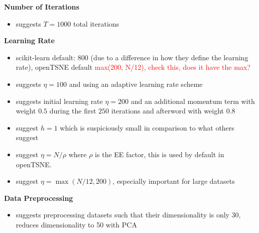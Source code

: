 \textbf{Number of Iterations}
\begin{itemize}
  \item \cite{vdMaa08} suggests $T=1000$ total iterations 
\end{itemize}

\textbf{Learning Rate}
\begin{itemize}
  \item scikit-learn default: 800 (due to a difference in how they define the learning rate), openTSNE default \textcolor{red}{max(200, N/12), check this, does it have the max?}
  \item \cite{vdMaa08} suggests $\eta =100$ and using an adaptive learning rate scheme
  \item \cite{vdMaa14} suggests initial learning rate $\eta=200$ and an additional momentum term with weight $0.5$ during the first $250$ iterations and afterword with weight $0.8$ 
  \item \cite{LinStei22} suggest $h=1$ which is suspiciously small in comparison to what others suggest
  \item \cite{belkina19} suggest $\eta = N/\rho$ where $\rho$ is the EE factor, this is used by default in openTSNE. 
  \item \cite{KoBe19SingleCell} suggest $\eta = \max(N/12, 200)$, especially important for large datasets 
\end{itemize}

\textbf{Data Preprocessing}
\begin{itemize}
  \item \cite{vdMaa08} suggests preprocessing datasets such that their dimensionality is only $30$, \cite{vdMaa14} reduces dimensionality to 50 with PCA
\end{itemize}

